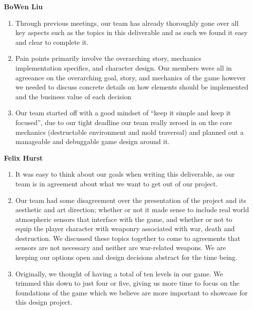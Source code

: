 \documentclass{article}
\begin{document}
\textbf{BoWen Liu}
\begin{enumerate}
\item{Through previous meetings, our team has already thoroughly gone over all key aspects such as the topics in this deliverable and as such we found it easy and clear to complete it.}
\item{Pain points primarily involve the overarching story, mechanics implementation specifics, and character design. Our members were all in agreeance on the overarching goal, story, and mechanics of the game however we needed to discuss concrete details on how elements should be implemented and the business value of each decision}
\item{Our team started off with a good mindset of “keep it simple and keep it focused”, due to our tight deadline our team really zeroed in on the core mechanics (destructable environment and mold traversal) and planned out a manageable and debuggable game design around it.}
\end{enumerate}

\textbf{Felix Hurst}
\begin{enumerate}
\item{It was easy to think about our goals when writing this deliverable, as our team is in agreement about what we want to get out of our project.}
\item{Our team had some disagreement over the presentation of the project and its aesthetic and art direction; whether or not it made sense to include real world atmospheric sensors that interface with the game, and whether or not to equip the player character with weaponry associated with war, death and destruction. We discussed these topics together to come to agreements that sensors are not necessary and neither are war-related weapons. We are keeping our options open and design decisions abstract for the time being.}
\item{Originally, we thought of having a total of ten levels in our game. We trimmed this down to just four or five, giving us more time to focus on the foundations of the game which we believe are more important to showcase for this design project.}
\end{enumerate}
\end{document}
